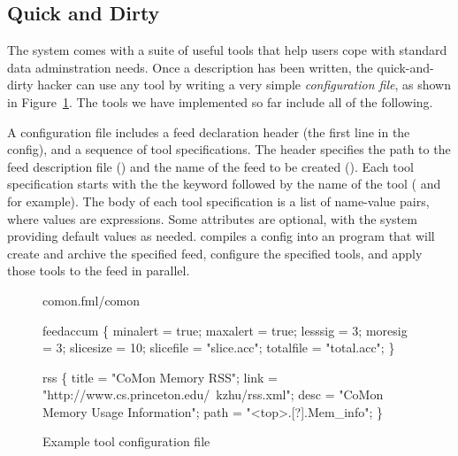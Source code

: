 \subsection{Quick and Dirty}
\label{sec:tools}
The \padsd{} system comes with a suite of useful tools that help users cope with standard data 
adminstration needs.  Once a \padsd{} description has been written, the quick-and-dirty
hacker can use any tool by writing a very simple {\em configuration file}, as shown in
Figure~\ref{fig:toolconfigs}.  
The tools we have implemented so far include all of the following.


A configuration file includes a feed declaration header 
(the first line in the config),
and a sequence of tool specifications. The header specifies the path to the 
feed description file () and the name of the feed to be created ().
Each tool specification starts with the the keyword  followed by the
name of the tool ( and  for example). The body of each tool specification 
is a list of name-value pairs, where values are \ocaml{} expressions. Some attributes are 
optional, with the system providing default values as needed. 
\padsd{} compiles a config into an \ocaml{} program that will create and archive the specified 
feed, configure the specified tools, and apply those tools to the feed in parallel.


\begin{figure}[tb]
\centering
\begin{codebox}
 comon.fml/comon

 feedaccum
\{
  minalert  = true;
  maxalert  = true;
  lesssig   = 3;
  moresig   = 3;
  slicesize = 10;
  slicefile = "slice.acc";
  totalfile = "total.acc";
\}

 rss
\{
  title = "CoMon Memory RSS";
  link  = "http://www.cs.princeton.edu/~kzhu/rss.xml";
  desc  = "CoMon Memory Usage Information";
  path  = "<top>.[?].Mem_info";
\}
\end{codebox}
\caption{Example tool configuration file}
\label{fig:toolconfigs}
\end{figure}







